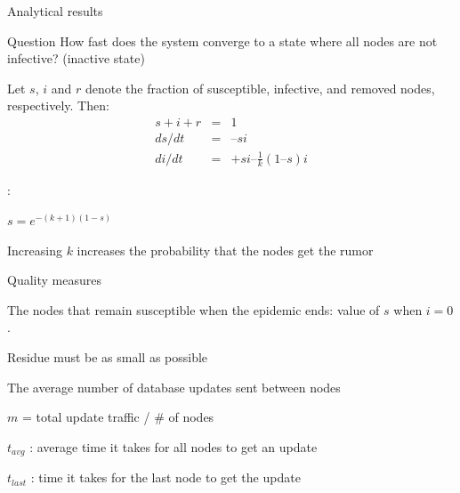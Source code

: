 \begin{frame}{Analytical results}

\begin{block}{Question}
How fast does the system converge to a state where all nodes are not infective? (inactive state)
\end{block}


Let $s$, $i$ and $r$ denote the fraction of susceptible, infective, and removed nodes, respectively. Then:
\begin{eqnarray*}
s + i + r &=& 1\\
ds/dt &=& – si\\
di/dt &=& +si –\frac{1}{k}(1 – s)i
\end{eqnarray*}

: 
\BI
\item $s = e^{-(k+1)(1-s)}$
\item Increasing $k$ increases the probability that the nodes get the
rumor
\EI


\end{frame}

\begin{frame}{Quality measures}
	
\begin{definition}[Residue]
\BI
\item The nodes that remain susceptible when the epidemic ends: value of $s$ when $i = 0$.
\item Residue must be as small as possible
\EI
\end{definition}

\begin{definition}[Traffic]
\BI
\item The average number of database updates sent between nodes
\item $m$ = total update traffic / \# of nodes
\EI
\end{definition}

\begin{definition}[Convergence]
\BI
\item $t_\mathit{avg}$ : average time it takes for all nodes to get an update
\item $t_\mathit{last}$ : time it takes for the last node to get the update
\EI
\end{definition}
\end{frame}

